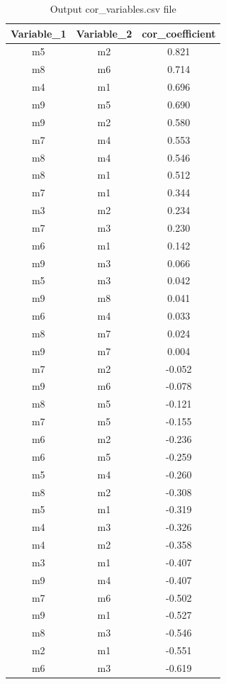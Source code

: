 \documentclass[english,a4paper,12pt]{article}
\begin{document}
\begin{table}[h!]
\caption[Correlation between variables]{Output \textsf{cor\_variables.csv} file}
\begin{center}
\begin{tabular}{ccc}
\toprule
  Variable\_1 & Variable\_2 & cor\_coefficient\\
\midrule
  m5 & m2 & 0.821\\
  m8 & m6 & 0.714\\
  m4 & m1 & 0.696\\
  m9 & m5 & 0.690\\
  m9 & m2 & 0.580\\
  m7 & m4 & 0.553\\
  m8 & m4 & 0.546\\
  m8 & m1 & 0.512\\
  m7 & m1 & 0.344\\
  m3 & m2 & 0.234\\
  m7 & m3 & 0.230\\
  m6 & m1 & 0.142\\
  m9 & m3 & 0.066\\
  m5 & m3 & 0.042\\
  m9 & m8 & 0.041\\
  m6 & m4 & 0.033\\
  m8 & m7 & 0.024\\
  m9 & m7 & 0.004\\
  m7 & m2 & -0.052\\
  m9 & m6 & -0.078\\
  m8 & m5 & -0.121\\
  m7 & m5 & -0.155\\
  m6 & m2 & -0.236\\
  m6 & m5 & -0.259\\
  m5 & m4 & -0.260\\
  m8 & m2 & -0.308\\
  m5 & m1 & -0.319\\
  m4 & m3 & -0.326\\
  m4 & m2 & -0.358\\
  m3 & m1 & -0.407\\
  m9 & m4 & -0.407\\
  m7 & m6 & -0.502\\
  m9 & m1 & -0.527\\
  m8 & m3 & -0.546\\
  m2 & m1 & -0.551\\
  m6 & m3 & -0.619\\
\bottomrule
\end{tabular}
\end{center}
\label{tab:cor_var}
\end{table}
\end{document}

